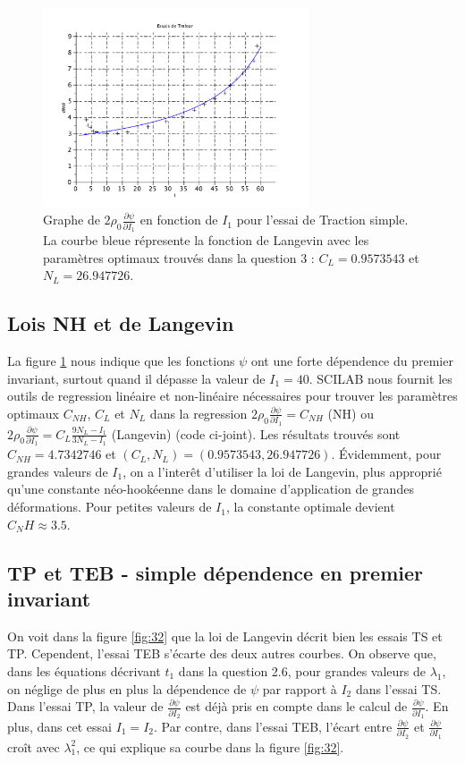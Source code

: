 \documentclass[a4paper,11pt]{article}
\begin{document}
\begin{figure}[!ht]
\centering
\includegraphics[width=0.7\textwidth]{scilab_prof/q31.pdf}
\caption{Graphe de $2 \rho_0 \frac{\partial\psi}{\partial I_1}$ en fonction de $I_1$ pour l'essai de Traction simple. La courbe bleue répresente la fonction de Langevin avec les paramètres optimaux trouvés dans la question 3 : $C_L = 0.9573543$ et $N_L=26.947726$.}
\label{fig:31}
\end{figure}

\subsection{Lois NH et de Langevin}
La figure \ref{fig:31} nous indique que les fonctions $\psi$ ont une forte dépendence du premier invariant, surtout quand il dépasse la valeur de $I_1 = 40$. SCILAB nous fournit les outils de regression linéaire et non-linéaire nécessaires pour trouver les paramètres optimaux $C_{NH}$, $C_L$ et $N_L$ dans la regression $2 \rho_0 \frac{\partial\psi}{\partial I_1} = C_{NH}$ (NH) ou $2 \rho_0 \frac{\partial\psi}{\partial I_1} = C_L \frac{9N_L-I_1}{3N_L-I_1}$ (Langevin) (code ci-joint). Les résultats trouvés sont $C_{NH} = 4.7342746$ et $(C_L, N_L) = (0.9573543, 26.947726)$. Évidemment, pour grandes valeurs de $I_1$, on a l'interêt d'utiliser la loi de Langevin, plus approprié qu'une constante néo-hookéenne dans le domaine d'application de grandes déformations. Pour petites valeurs de $I_1$, la constante optimale devient $C_NH \approx 3.5$.

\subsection{TP et TEB - simple dépendence en premier invariant}

On voit dans la figure \ref{fig:32} que la loi de Langevin décrit bien les essais TS et TP. Cependent, l'essai TEB s'écarte des deux autres courbes. On observe que, dans les équations décrivant $t_1$ dans la question 2.6, pour grandes valeurs de $\lambda_1$, on néglige de plus en plus la dépendence de $\psi$ par rapport à $I_2$ dans l'essai TS. Dans l'essai TP, la valeur de $\frac{\partial\psi}{\partial I_2}$ est déjà pris en compte dans le calcul de $\frac{\partial\psi}{\partial I_1}$. En plus, dans cet essai $I_1 = I_2$. Par contre, dans l'essai TEB, l'écart entre $\frac{\partial\psi}{\partial I_2}$ et $\frac{\partial\psi}{\partial I_1}$ croît avec $\lambda_1^2$, ce qui explique sa courbe dans la figure \ref{fig:32}.
\end{document}
